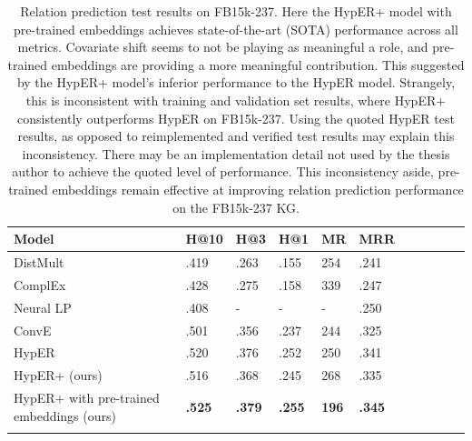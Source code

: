 \begin{table}[H]
		\centering
		\begin{tabular}{lllllllllll}
  			\textbf{Model} & \textbf{H@10} & \textbf{H@3} & \textbf{H@1} & \textbf{MR} & \textbf{MRR} \\
  			\hline
  			DistMult \unskip~\citep{yang2014embedding} & .419 & .263 & .155 & 254 & .241 \\
  			ComplEx \unskip~\citep{trouillon2016complex} & .428 & .275 & .158 & 339 & .247 \\
  			Neural LP  \unskip~\citep{yang2017differentiable} & .408 & - & - & - & .250 \\
			ConvE \unskip~\citep{dettmers2018convolutional} & .501 & .356 & .237 & 244 & .325 \\
			HypER \unskip~\citep{balazevic2019hypernetwork} & .520 & .376 & .252 & 250 & .341 \\
			HypER+ (ours) & .516 & .368 & .245 & 268 & .335 \\
  			\hline
  			HypER+ with pre-trained embeddings (ours) & \textbf{.525} & \textbf{.379} & \textbf{.255} & \textbf{196} & \textbf{.345} \\
			&
		\end{tabular}
		\captionsetup{justification=centering}
		\caption{Relation prediction test results on FB15k-237. Here the HypER+ model with pre-trained embeddings achieves state-of-the-art (SOTA) performance across all metrics. Covariate shift seems to not be playing as meaningful a role, and pre-trained embeddings are providing a more meaningful contribution. This suggested by the HypER+ model's inferior performance to the HypER model. Strangely, this is inconsistent with training and validation set results, where HypER+ consistently outperforms HypER on FB15k-237. Using the quoted HypER test results, as opposed to reimplemented and verified test results may explain this inconsistency. There may be an implementation detail not used by the thesis author to achieve the quoted level of performance. This inconsistency aside, pre-trained embeddings remain effective at improving relation prediction performance on the FB15k-237 KG.}
\end{table}



